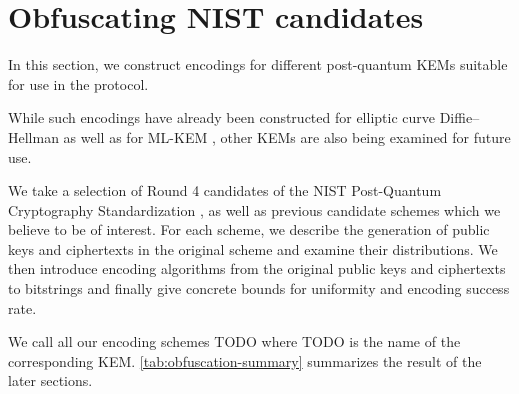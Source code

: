 \chapter{Obfuscating NIST candidates}\label{ch:obfuscation}

In this section, we construct encodings for different post-quantum KEMs suitable for use in the \drivel protocol.

While such encodings have already been constructed for elliptic curve Diffie–Hellman \cite{CCS:BHKL13, tor-dev-udh, USENIX:WWGH11} as well as for ML-KEM \cite{CCS:GunSteVei24}, other KEMs are also being examined for future use.

We take a selection of Round 4 candidates of the NIST Post-Quantum Cryptography Standardization \cite{nist-standardization}, as well as previous candidate schemes which we believe to be of interest.
For each scheme, we describe the generation of public keys and ciphertexts in the original scheme and examine their distributions. We then introduce encoding algorithms from the original public keys and ciphertexts to bitstrings and finally give concrete bounds for uniformity and encoding success rate.

We call all our encoding schemes TODO where TODO is the name of the corresponding KEM. \cref{tab:obfuscation-summary} summarizes the result of the later sections.

